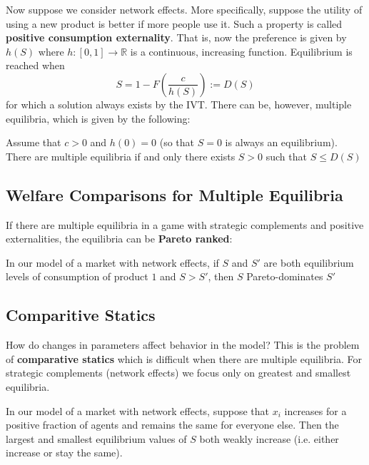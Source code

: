 \documentclass[9pt]{article}
\begin{document}
\begin{multicols}{2}
Now suppose we consider network effects. More specifically, suppose the
utility of using a new product is better if more people use it. Such 
a property is called \textbf{positive consumption externality}. That 
is, now the preference is given by $h(S)$ where $h:[0,1] \to \mathbb{R}$
is a continuous, increasing function. Equilibrium is reached when
\begin{equation}
    S = 1 - F\left(\frac{c}{h(S)}\right) := D(S)
\end{equation}
for which a solution always exists by the IVT. There can be, however,
multiple equilibria, which is given by the following:
\begin{theorem}
    Assume that $c > 0$ and $h(0) = 0$ (so that $S = 0$ is always an equilibrium). There are multiple equilibria if and only there exists $S > 0$ such that $S \le D(S)$
\end{theorem}

\subsection{Welfare Comparisons for Multiple Equilibria}

If there are multiple equilibria in a game with strategic complements
and positive externalities, the equilibria can be \textbf{Pareto ranked}:
\begin{theorem}
    In our model of a market with network effects, if $S$ and $S'$ are 
    both equilibrium levels of consumption of product $1$ and $S > S'$, then $S$ Pareto-dominates $S'$
\end{theorem}

\subsection{Comparitive Statics}
How do changes in parameters affect behavior in the model? This is the
problem of \textbf{comparative statics} which is difficult when there
are multiple equilibria. For strategic complements (network effects)
we focus only on greatest and smallest equilibria. 

\begin{theorem}
    In our model of a market with network effects, suppose that $x_i$ 
    increases for a positive fraction of agents and remains the same 
    for everyone else. Then the largest and smallest equilibrium values
    of $S$ both weakly increase (i.e. either increase or stay the same).
\end{theorem}


\end{multicols}
\end{document}
